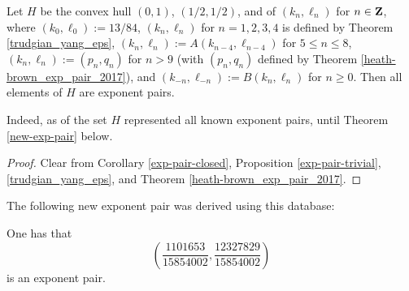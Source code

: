 \begin{corollary}\label{H-pairs}\cite[Theorem 1.3]{trudgian-yang}  Let $H$ be the convex hull $(0,1)$, $(1/2,1/2)$, and of $(k_n,\ell_n)$ for $n \in \mathbf{Z}$, where $(k_0,\ell_0) := 13/84$, $(k_n,\ell_n)$ for $n=1,2,3,4$ is defined by Theorem \ref{trudgian_yang_eps}, $(k_n,\ell_n) := A(k_{n-4},\ell_{n-4})$ for $5 \leq n \leq 8$, $(k_n,\ell_n) := (p_n,q_n)$ for $n > 9$ (with $(p_n,q_n)$ defined by Theorem \ref{heath-brown_exp_pair_2017}), and $(k_{-n},\ell_{-n}) := B(k_n,\ell_n)$ for $n \geq 0$.  Then all elements of $H$ are exponent pairs.
\end{corollary}

Indeed, as of \cite{trudgian-yang} the set $H$ represented all known exponent pairs, until Theorem \ref{new-exp-pair} below.

\begin{proof} Clear from Corollary \ref{exp-pair-closed}, Proposition \ref{exp-pair-trivial}, \ref{trudgian_yang_eps}, and Theorem \ref{heath-brown_exp_pair_2017}.
\end{proof}

The following new exponent pair was derived using this database:

\begin{theorem}\label{new-exp-pair} One has that
\[
\left(\frac{1101653}{15854002}, \frac{12327829}{15854002}\right)
\]
is an exponent pair.
\end{theorem}
\derived
{}
